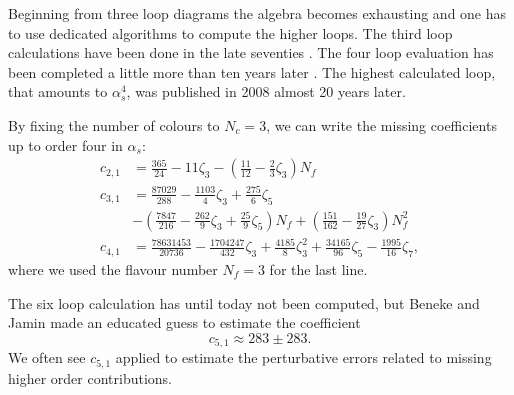 \documentclass[../../index.tex]{subfiles}
\begin{document}
Beginning from three loop diagrams the algebra becomes exhausting and one has to
use dedicated algorithms to compute the higher loops. The third loop
calculations have been done in the late seventies
\cite{Chetyrkin1979,Dine1979,Celmaster1979}. The four loop evaluation has been
completed a little more than ten years later
\cite{Gorishnii1990,Surguladze1990}. The highest calculated loop, that amounts
to \(\alpha_s^4\), was published in 2008 \cite{Baikov2008} almost 20 years
later.

By fixing the number of colours to \(N_c=3\), we can write the missing
coefficients up to order four in \(\alpha_s\):
\begin{equation}
  \label{eq:adlerCoefficients}
  \begin{split}
    c_{2,1} &= \frac{365}{24} - 11 \zeta_3 - \left( \frac{11}{12} - \frac{2}{3}\zeta_3 \right) N_f \\
    c_{3,1} &= \frac{87029}{288} - \frac{1103}{4} \zeta_3 + \frac{275}{6}\zeta_5 \\
    &- \left( \frac{7847}{216} - \frac{262}{9} \zeta_3 + \frac{25}{9} \zeta_5 \right) N_f + \left( \frac{151}{162} - \frac{19}{27}\zeta_3\right)N_f^2 \\
    c_{4,1} &= \frac{78631453}{20736} - \frac{1704247}{432}\zeta_3 +
    \frac{4185}{8}\zeta_3^2 + \frac{34165}{96}\zeta_5 - \frac{1995}{16}\zeta_7,
  \end{split}
\end{equation}
where we used the flavour number \(N_f=3\) for the last line.

The six loop calculation has until today not been computed, but Beneke and Jamin
\cite{Beneke2008} made an educated guess to estimate the coefficient
\begin{equation}
  c_{5,1} \approx 283 \pm 283.
\end{equation}
We often see \(c_{5,1}\) applied to estimate the perturbative errors related to
missing higher order contributions.
\end{document}
